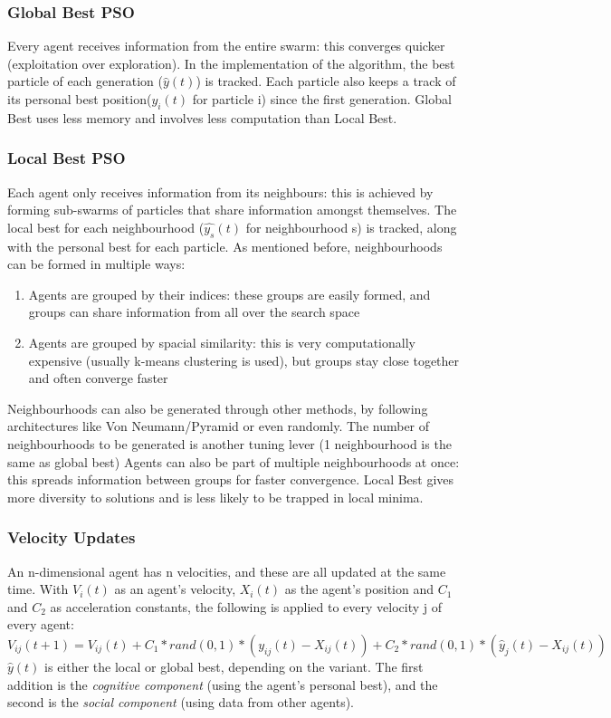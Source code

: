 \subsubsection{Global Best PSO}
Every agent receives information from the entire swarm: this converges quicker (exploitation over exploration). In the implementation of the algorithm, the best particle of each generation ($\hat{y}(t)$) is tracked. Each particle also keeps a track of its personal best position($y_i(t)$ for particle i) since the first generation. Global Best uses less memory and involves less computation than Local Best.

\subsubsection{Local Best PSO}
Each agent only receives information from its neighbours: this is achieved by forming sub-swarms of particles that share information amongst themselves. The local best for each neighbourhood ($\hat{y_s}(t)$ for neighbourhood s) is tracked, along with the personal best for each particle. As mentioned before, neighbourhoods can be formed in multiple ways:
\begin{enumerate}
    \item Agents are grouped by their indices: these groups are easily formed, and groups can share information from all over the search space 
    \item Agents are grouped by spacial similarity: this is very computationally expensive (usually k-means clustering is used), but groups stay close together and often converge faster
\end{enumerate}
Neighbourhoods can also be generated through other methods, by following architectures like Von Neumann/Pyramid or even randomly. The number of neighbourhoods to be generated is another tuning lever (1 neighbourhood is the same as global best) Agents can also be part of multiple neighbourhoods at once: this spreads information between groups for faster convergence. Local Best gives more diversity to solutions and is less likely to be trapped in local minima.

\subsubsection{Velocity Updates}
An n-dimensional agent has n velocities, and these are all updated at the same time. With $V_i(t)$ as an agent's velocity, $X_i(t)$ as the agent's position and $C_1$ and $C_2$ as acceleration constants, the following is applied to every velocity j of every agent:
\begin{equation}
    V_{ij}(t+1) = V_{ij}(t) + C_1 * rand(0,1) * (y_{ij}(t) - X_{ij}(t)) + C_2 * rand(0,1) * (\hat{y}_{j}(t) - X_{ij}(t)) 
\end{equation}
$\hat{y}(t)$ is either the local or global best, depending on the variant. The first addition is the \emph{cognitive component} (using the agent's personal best), and the second is the \emph{social component} (using data from other agents). 

